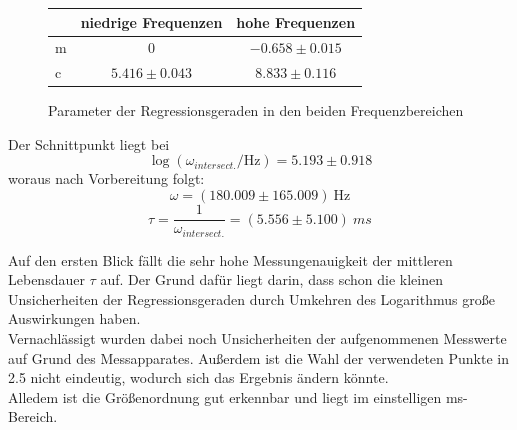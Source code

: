 \newpage

\begin{figure}[t]
\label{A4_param}
\centering
\caption{Parameter der Regressionsgeraden in den beiden Frequenzbereichen}
\vspace{0.4cm}
\begin{tabular}{lcc}
& niedrige Frequenzen & hohe Frequenzen \\ 
\hline
\hline
m & 0 & $-0.658 \pm 0.015$\\
c & $5.416 \pm 0.043$ & $8.833 \pm 0.116$ \\
\end{tabular}
\end{figure}

Der Schnittpunkt liegt bei 
$$\log(\omega _{intersect.} / \text{Hz}) = 5.193 \pm 0.918$$
woraus nach Vorbereitung folgt:
$$\omega = (180.009 \pm 165.009) \ \text{Hz} $$
$$\tau = \frac{1}{\omega _{intersect.}} = (5.556 \pm 5.100) \ ms$$

Auf den ersten Blick fällt die sehr hohe Messungenauigkeit der mittleren Lebensdauer $\tau$ auf. Der Grund dafür liegt darin, dass schon die kleinen Unsicherheiten der Regressionsgeraden durch Umkehren des Logarithmus große Auswirkungen haben. \\
Vernachlässigt wurden dabei noch Unsicherheiten der aufgenommenen Messwerte auf Grund des Messapparates. Außerdem ist die Wahl der verwendeten Punkte in 2.5 nicht eindeutig, wodurch sich das Ergebnis ändern könnte.\\
Alledem ist die Größenordnung gut erkennbar und liegt im einstelligen ms-Bereich.  

